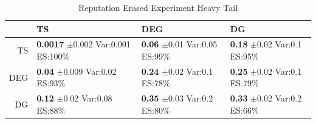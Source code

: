 \documentclass[11pt,letterpaper]{article}
\begin{document}
\begin{table}[H]
\centering
\caption{Reputation Erased Experiment Heavy Tail} 
\begin{tabular}{rlll}
  \hline
 & TS & DEG &  DG \\ 
  \hline
TS & \makecell{\textbf{0.0017} $\pm$0.002\\Var:0.001\\ES:100\%} & \makecell{\textbf{0.06} $\pm$0.01\\Var:0.05\\ES:99\%} & \makecell{\textbf{0.18} $\pm$0.02\\Var:0.1\\ES:95\%} \\ 
  DEG & \makecell{\textbf{0.04} $\pm$0.009\\Var:0.02\\ES:93\%} & \makecell{\textbf{0.24} $\pm$0.02\\Var:0.1\\ES:78\%} & \makecell{\textbf{0.25} $\pm$0.02\\Var:0.1\\ES:79\%} \\ 
   DG & \makecell{\textbf{0.12} $\pm$0.02\\Var:0.08\\ES:88\%} & \makecell{\textbf{0.35} $\pm$0.03\\Var:0.2\\ES:80\%} & \makecell{\textbf{0.33} $\pm$0.02\\Var:0.2\\ES:66\%} \\ 
   \hline
\end{tabular}
\end{table}
\end{document}
